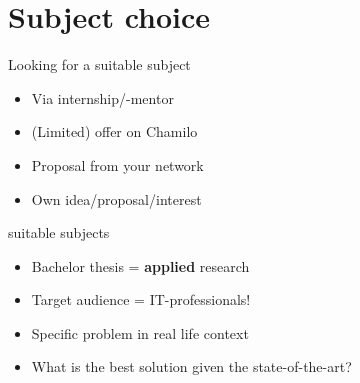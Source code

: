 \documentclass[aspectratio=169]{beamer}
\begin{document}
    \section{Subject choice}
    
    \begin{frame}{Looking for a suitable subject}
        
        \begin{itemize}
            \item Via internship/-mentor
            \item (Limited) offer on Chamilo
            \item Proposal from your network 
            \item Own idea/proposal/interest
        \end{itemize}
        
        \bigskip
        
    \end{frame}
    
    \begin{frame}{suitable subjects}
        
        \begin{itemize}
            \item Bachelor thesis = \textbf{applied} research
            \item Target audience = IT-professionals!
            \item Specific problem in real life context
            \item What is the best solution given the state-of-the-art?
        \end{itemize}
        
        \bigskip
        
    \end{frame}
    
\end{document}
